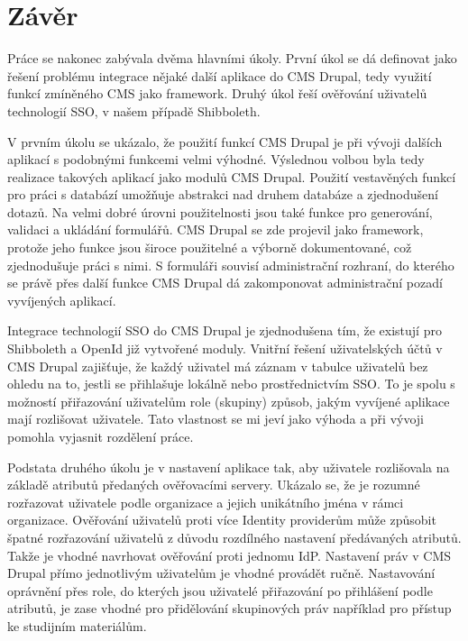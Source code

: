 \documentclass[11pt,twoside,a4paper]{book}
\begin{document}
\chapter{Závěr}
\noindent
\par
Práce se nakonec zabývala dvěma hlavními úkoly. První úkol se dá definovat jako řešení problému integrace nějaké další aplikace do CMS Drupal, tedy využití funkcí zmíněného CMS jako framework. Druhý úkol řeší ověřování uživatelů technologií SSO, v našem případě Shibboleth.
\par
V prvním úkolu se ukázalo, že použití funkcí CMS Drupal je při vývoji dalších aplikací s podobnými funkcemi velmi výhodné. Výslednou volbou byla tedy realizace takových aplikací jako modulů CMS Drupal. Použití vestavěných funkcí pro práci s databází umožňuje abstrakci nad druhem databáze a zjednodušení dotazů. Na velmi dobré úrovni použitelnosti jsou také funkce pro generování, validaci a ukládání formulářů. CMS Drupal se zde projevil jako framework, protože jeho funkce jsou široce použitelné a výborně dokumentované, což zjednodušuje práci s nimi. S formuláři souvisí administrační rozhraní, do kterého se právě přes další funkce CMS Drupal dá zakomponovat administrační pozadí vyvíjených aplikací.
\par
Integrace technologií SSO do CMS Drupal je zjednodušena tím, že existují pro Shibboleth a OpenId již vytvořené moduly. Vnitřní řešení uživatelských účtů v CMS Drupal zajišťuje, že každý uživatel má záznam v tabulce uživatelů bez ohledu na to, jestli se přihlašuje lokálně nebo prostřednictvím SSO. To je spolu s možností přiřazování uživatelům role (skupiny) způsob, jakým vyvíjené aplikace mají rozlišovat uživatele. Tato vlastnost se mi jeví jako výhoda a při vývoji pomohla vyjasnit rozdělení práce.
\par
Podstata druhého úkolu je v nastavení aplikace tak, aby uživatele rozlišovala na základě atributů předaných ověřovacími servery. Ukázalo se, že je rozumné rozřazovat uživatele podle organizace a jejich unikátního jména v rámci organizace. Ověřování uživatelů proti více Identity providerům může způsobit špatné rozřazování uživatelů z důvodu rozdílného nastavení předávaných atributů. Takže je vhodné navrhovat ověřování proti jednomu IdP. Nastavení práv v CMS Drupal přímo jednotlivým uživatelům je vhodné provádět ručně. Nastavování oprávnění přes role, do kterých jsou uživatelé přiřazování po přihlášení podle atributů, je zase vhodné pro přidělování skupinových práv například pro přístup ke studijním materiálům.
\end{document}
